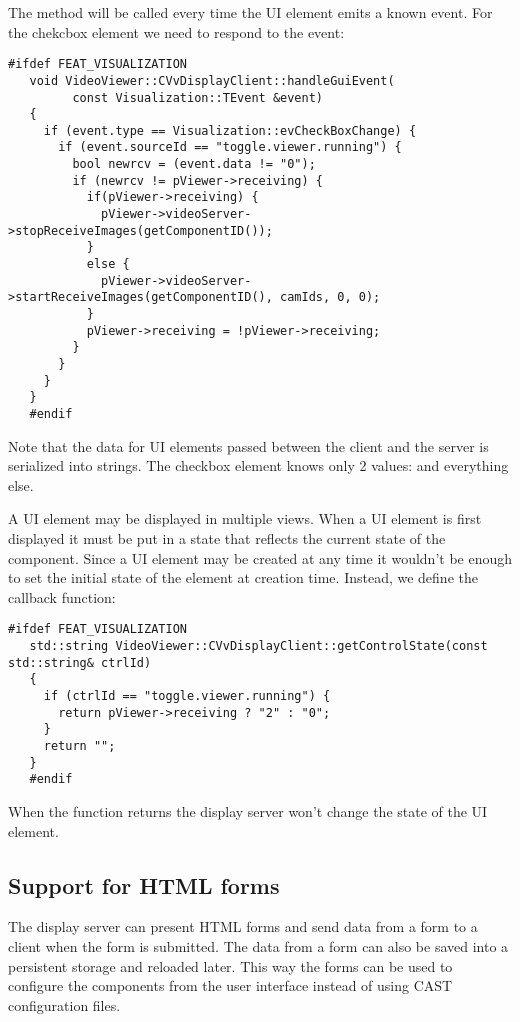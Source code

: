 The method  will be called every time the UI element
emits a known event. For the chekcbox element we need to respond to the
 event:

\begin{Verbatim}[fontsize=\scriptsize,gobble=3]
   #ifdef FEAT_VISUALIZATION
   void VideoViewer::CVvDisplayClient::handleGuiEvent(
         const Visualization::TEvent &event)
   {
     if (event.type == Visualization::evCheckBoxChange) {
       if (event.sourceId == "toggle.viewer.running") {
         bool newrcv = (event.data != "0");
         if (newrcv != pViewer->receiving) {
           if(pViewer->receiving) {
             pViewer->videoServer->stopReceiveImages(getComponentID());
           }
           else {
             pViewer->videoServer->startReceiveImages(getComponentID(), camIds, 0, 0);
           }
           pViewer->receiving = !pViewer->receiving;
         }
       }
     }
   }
   #endif
\end{Verbatim}

Note that the data for UI elements passed between the client and the server is
serialized into strings. The checkbox element knows only 2 values: 
and everything else.

A UI element may be displayed in multiple views. When a UI element is first
displayed it must be put in a state that reflects the current state of the
component.  Since a UI element may be created at any time it wouldn't be enough
to set the initial state of the element at creation time. Instead, we define
the  callback function:

\begin{Verbatim}[fontsize=\scriptsize,gobble=3]
   #ifdef FEAT_VISUALIZATION
   std::string VideoViewer::CVvDisplayClient::getControlState(const std::string& ctrlId)
   {
     if (ctrlId == "toggle.viewer.running") {
       return pViewer->receiving ? "2" : "0";
     }
     return "";
   }
   #endif
\end{Verbatim}

When the function returns  the display server won't change the state
of the UI element.

\subsection{Support for HTML forms}\label{section:HtmlForms}

The display server can present HTML forms and send data from a form to a client
when the form is submitted. The data from a form can also be saved into a
persistent storage and reloaded later. This way the forms can be used to
configure the components from the user interface instead of using CAST
configuration files.
%
%
%
%

